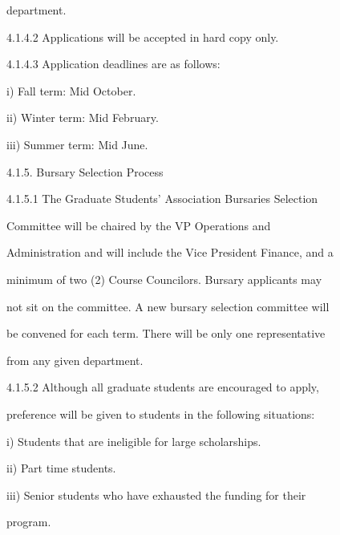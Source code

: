                  department.   



4.1.4.2       Applications will be accepted in hard copy only.   



4.1.4.3       Application deadlines are as follows:   



         i)      Fall term: Mid October.  



         ii)     Winter term: Mid February.   



         iii)    Summer term: Mid June.  



  



4.1.5. Bursary Selection Process  



4.1.5.1       The      Graduate        Students'      Association         Bursaries       Selection  

              Committee         will    be    chaired      by    the     VP     Operations       and  

              Administration and will include the Vice President Finance, and a  

              minimum of two (2) Course Councilors. Bursary applicants may  

              not sit on the committee. A new bursary selection committee will  

              be convened for each term. There will be only one representative  

              from any given department.   



4.1.5.2       Although        all   graduate      students      are    encouraged        to   apply,  

              preference will be given to students in the following situations:   



         i)      Students that are ineligible for large scholarships.  



         ii)     Part time students.  



         iii)    Senior  students  who  have  exhausted  the  funding  for  their  

                 program.  



